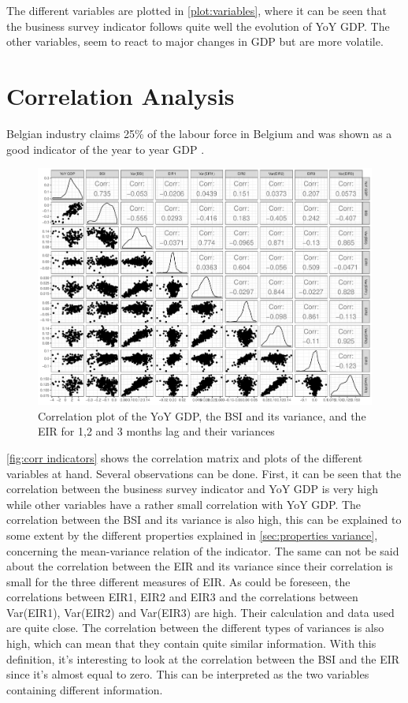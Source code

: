 \documentclass[12pt,a4paper,oneside]{book}
\begin{document}
The different variables are plotted in \autoref{plot:variables}, where it can be seen that the business survey indicator follows quite well the evolution of YoY GDP. 
The other variables, seem to react to major changes in GDP but are more volatile.


\section{Correlation Analysis}

Belgian industry claims 25\% of the labour force in Belgium and was shown as a good indicator of the year to year GDP
\citep{de_greef_national_2009}.

\begin{figure}[H]
    \centering
    \includegraphics[scale=0.52]{Graphs/corr_indicators.pdf}
    \caption{Correlation plot of the YoY GDP, the BSI and its variance, and the EIR for 1,2 and 3 months lag and their variances}
    \label{fig:corr indicators}
\end{figure}

\autoref{fig:corr indicators} shows the correlation matrix and plots of the different variables at hand. 
Several observations can be done.
First, it can be seen that the correlation between the business survey indicator and YoY GDP is very high while other variables have a rather small correlation with YoY GDP.
The correlation between the BSI and its variance is also high, this can be explained to some extent by the different properties explained in \autoref{sec:properties variance}, concerning the mean-variance relation of the indicator.
The same can not be said about the correlation between the EIR and its variance since their correlation is small for the three different measures of EIR.
As could be foreseen, the correlations between EIR1, EIR2 and EIR3 and the correlations between Var(EIR1), Var(EIR2) and Var(EIR3) are high. Their calculation and data used are quite close.
The correlation between the different types of variances is also high, which can mean that they contain quite similar information.
With this definition, it's interesting to look at the correlation between the BSI and the EIR since it's almost equal to zero. This can be interpreted as the two variables containing different information.
\end{document}
